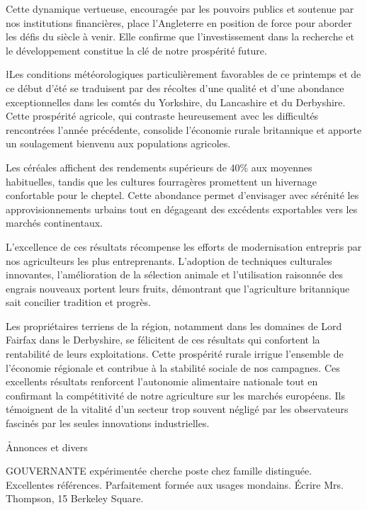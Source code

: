 \documentclass{news}
\begin{document}
Cette dynamique vertueuse, encouragée par les pouvoirs publics et soutenue par nos institutions financières, place l'Angleterre en position de force pour aborder les défis du siècle à venir. Elle confirme que l'investissement dans la recherche et le développement constitue la clé de notre prospérité future.

\l{L}es conditions météorologiques particulièrement favorables de ce printemps et de ce début d'été se traduisent par des récoltes d'une qualité et d'une abondance exceptionnelles dans les comtés du Yorkshire, du Lancashire et du Derbyshire. Cette prospérité agricole, qui contraste heureusement avec les difficultés rencontrées l'année précédente, consolide l'économie rurale britannique et apporte un soulagement bienvenu aux populations agricoles.

Les céréales affichent des rendements supérieurs de 40\% aux moyennes habituelles, tandis que les cultures fourragères promettent un hivernage confortable pour le cheptel. Cette abondance permet d'envisager avec sérénité les approvisionnements urbains tout en dégageant des excédents exportables vers les marchés continentaux.

L'excellence de ces résultats récompense les efforts de modernisation entrepris par nos agriculteurs les plus entreprenants. L'adoption de techniques culturales innovantes, l'amélioration de la sélection animale et l'utilisation raisonnée des engrais nouveaux portent leurs fruits, démontrant que l'agriculture britannique sait concilier tradition et progrès.

Les propriétaires terriens de la région, notamment dans les domaines de Lord Fairfax dans le Derbyshire, se félicitent de ces résultats qui confortent la rentabilité de leurs exploitations. Cette prospérité rurale irrigue l'ensemble de l'économie régionale et contribue à la stabilité sociale de nos campagnes.
Ces excellents résultats renforcent l'autonomie alimentaire nationale tout en confirmant la compétitivité de notre agriculture sur les marchés européens. Ils témoignent de la vitalité d'un secteur trop souvent négligé par les observateurs fascinés par les seules innovations industrielles.

\h{Annonces et divers}

GOUVERNANTE expérimentée cherche poste chez famille distinguée. Excellentes références. Parfaitement formée aux usages mondains. Écrire Mrs. Thompson, 15 Berkeley Square.
\end{document}
